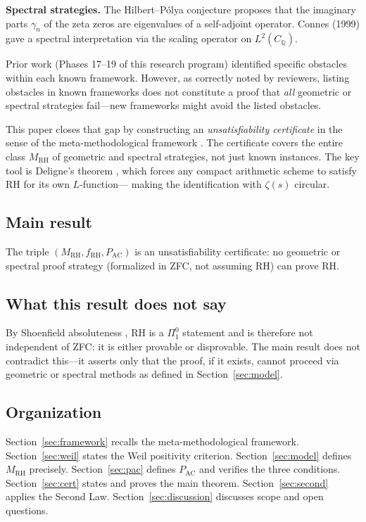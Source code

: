 \documentclass[12pt]{article}
\newcommand{\QQ}{\mathbb{Q}}
\newcommand{\MRH}{M_{\mathrm{RH}}}
\newcommand{\PAC}{P_{\mathrm{AC}}}
\begin{document}
\textbf{Spectral strategies.} The Hilbert--P\'olya conjecture proposes
that the imaginary parts $\gamma_n$ of the zeta zeros are eigenvalues
of a self-adjoint operator. Connes (1999) gave a spectral interpretation
via the scaling operator on $L^2(C_\QQ)$.

Prior work (Phases 17--19 of this research program) identified specific
obstacles within each known framework. However, as correctly noted by
reviewers, listing obstacles in known frameworks does not constitute a
proof that \emph{all} geometric or spectral strategies fail---new
frameworks might avoid the listed obstacles.

This paper closes that gap by constructing an \emph{unsatisfiability
certificate} in the sense of the meta-methodological framework
\cite{metamethod2026}. The certificate covers the entire class
$\MRH$ of geometric and spectral strategies, not just known instances.
The key tool is Deligne's theorem \cite{deligne1974}, which forces
any compact arithmetic scheme to satisfy RH for its own $L$-function---
making the identification with $\zeta(s)$ circular.

\subsection*{Main result}

\begin{theorem*}[Informal]
The triple $(\MRH, f_{\mathrm{RH}}, \PAC)$ is an unsatisfiability
certificate: no geometric or spectral proof strategy (formalized in
ZFC, not assuming RH) can prove RH.
\end{theorem*}

\subsection*{What this result does not say}

By Shoenfield absoluteness \cite{shoenfield1961}, RH is a
$\Pi^0_1$ statement and is therefore not independent of ZFC: it is
either provable or disprovable. The main result does not contradict
this---it asserts only that the proof, if it exists, cannot proceed
via geometric or spectral methods as defined in Section~\ref{sec:model}.

\subsection*{Organization}

Section~\ref{sec:framework} recalls the meta-methodological framework.
Section~\ref{sec:weil} states the Weil positivity criterion.
Section~\ref{sec:model} defines $\MRH$ precisely.
Section~\ref{sec:pac} defines $\PAC$ and verifies the three conditions.
Section~\ref{sec:cert} states and proves the main theorem.
Section~\ref{sec:second} applies the Second Law.
Section~\ref{sec:discussion} discusses scope and open questions.
\end{document}
